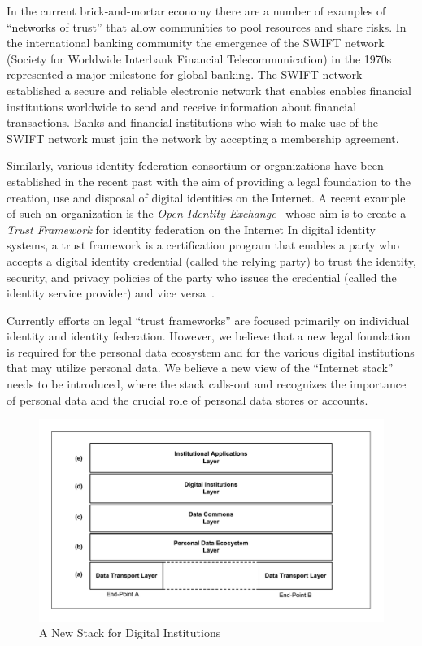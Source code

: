 In the current brick-and-mortar economy there are a number of examples
of ``networks of trust'' that allow communities to pool resources and share risks.
In the international banking community the emergence
of the SWIFT network~\cite{SWIFTnetwork} 
(Society for Worldwide Interbank Financial Telecommunication) 
in the 1970s represented a major milestone for global banking.
The SWIFT network established a secure and reliable electronic network
that enables enables financial institutions worldwide 
to send and receive information about financial transactions.
Banks and financial institutions who wish to make use of the SWIFT network
must join the network by accepting a membership agreement.

Similarly, various identity federation consortium or organizations
have been established in the recent past with the aim of providing
a legal foundation to the creation, use and disposal of digital identities
on the Internet.
A recent example of such an organization is
the {\em Open Identity Exchange}~\cite{OIX-website}
whose aim is to create a {\em  Trust Framework} for identity federation
on the Internet
In digital identity systems, a trust framework
is a certification program that enables a party
who accepts a digital identity credential
(called the relying party) to trust the identity,
security, and privacy policies of the party
who issues the credential (called the identity
service provider) and vice versa~\cite{OIX-website}.

Currently efforts on legal ``trust frameworks''
are focused primarily on individual identity and identity federation.
However, we believe that a new legal foundation is
required for the personal data ecosystem and for
the various digital institutions that may utilize
personal data.
We believe a new view of the ``Internet stack''
needs to be introduced, where the stack
calls-out and recognizes the importance of personal data
and the crucial role of personal data stores or accounts.



\begin{figure}[!t]
\centering
\includegraphics[width=7in]{figure-new-stack}
\caption{A New Stack for Digital Institutions}
\label{fig:newstack}
\end{figure}



